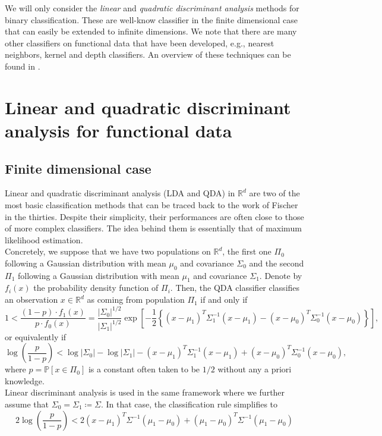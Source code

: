 \documentclass[10pt, a4paper]{report}
\newcommand{\R}[0]{\mathbb{R}}
\newcommand{\Pp}[0]{\mathbb{P}}
\theoremstyle{definition}
\theoremstyle{remark}
\begin{document}
We will only consider the \emph{linear} and \emph{quadratic discriminant analysis} methods for binary classification. These are well-know classifier in the finite dimensional case that can easily be extended to infinite dimensions. We note that there are many other classifiers on functional data that have been developed, e.g., nearest neighbors, kernel and depth classifiers. An overview of these techniques can be found in \cite[Chapter 10]{oxford}.

\section{Linear and quadratic discriminant analysis for functional data}
\subsection{Finite dimensional case}
Linear and quadratic discriminant analysis (LDA and QDA) in $\R^d$ are two of the most basic classification methods that can be traced back to the work of Fischer in the thirties. Despite their simplicity, their performances are often close to those of more complex classifiers. The idea behind them is essentially that of maximum likelihood estimation.\\
Concretely, we suppose that we have two populations on $\R^d$, the first one $\Pi_0$ following a Gaussian distribution with mean $\mu_0$ and covariance $\Sigma_0$ and the second $\Pi_1$ following a Gaussian distribution with mean $\mu_1$ and covariance $\Sigma_1$. Denote by $f_i(x)$ the probability density function of $\Pi_i$. Then, the QDA classifier classifies an observation $x\in \R^d$ as coming from population $\Pi_1$ if and only if 
$$1<\frac{(1-p)\cdot f_1(x)}{p\cdot f_0(x)}=\frac{\vert \Sigma_0\vert^{1/2}}{\vert \Sigma_1\vert^{1/2}}\exp\left[-\frac{1}{2}\left\{ (x-\mu_1)^T\Sigma_1^{-1} (x-\mu_1) - (x-\mu_0)^T\Sigma_0^{-1} (x-\mu_0) \right\} \right],$$
or equivalently if 
$$\log\left(\frac{p}{1-p}\right) < \log \vert \Sigma_0\vert - \log \vert \Sigma_1\vert - (x-\mu_1)^T\Sigma_1^{-1} (x-\mu_1) + (x-\mu_0)^T\Sigma_0^{-1} (x-\mu_0),$$
where $p= \Pp[x \in \Pi_0]$ is a constant often taken to be $1/2$ without any a priori knowledge.\\
Linear discriminant analysis is used in the same framework where we further assume that $\Sigma_0 = \Sigma_1 \coloneqq \Sigma$. In that case, the classification rule simplifies to 
$$2\log\left(\frac{p}{1-p}\right) < 2(x-\mu_1)^T\Sigma^{-1} (\mu_1-\mu_0) + (\mu_1-\mu_0)^T\Sigma^{-1} (\mu_1-\mu_0)$$
\end{document}
